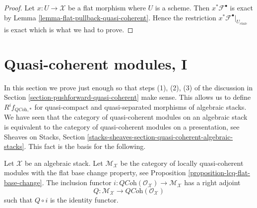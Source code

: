 \begin{proof}
Let $x : U \to \mathcal{X}$ be a flat morphism where $U$ is a scheme.
Then $x^*\mathcal{F}^\bullet$ is exact by
Lemma \ref{lemma-flat-pullback-quasi-coherent}.
Hence the restriction $x^*\mathcal{F}^\bullet|_{U_{\acute{e}tale}}$
is exact which is what we had to prove.
\end{proof}





\section{Quasi-coherent modules, I}
\label{section-quasi-coherent}

\noindent
In this section we prove just enough so that steps (1), (2), (3)
of the discussion in
Section \ref{section-pushforward-quasi-coherent}
make sense. This allows us to define $R^if_{\textit{QCoh}, *}$
for quasi-compact and quasi-separated morphisms of algebraic stacks.
We have seen that the category of quasi-coherent modules on an algebraic stack
is equivalent to the category of quasi-coherent modules on a presentation, see
Sheaves on Stacks, Section
\ref{stacks-sheaves-section-quasi-coherent-algebraic-stacks}.
This fact is the basis for the following.

\begin{lemma}
\label{lemma-adjoint}
Let $\mathcal{X}$ be an algebraic stack. Let $\mathcal{M}_\mathcal{X}$
be the category of locally quasi-coherent modules with the
flat base change property, see
Proposition \ref{proposition-lcq-flat-base-change}.
The inclusion functor
$i : \textit{QCoh}(\mathcal{O}_\mathcal{X}) \to \mathcal{M}_\mathcal{X}$
has a right adjoint
$$
Q : \mathcal{M}_\mathcal{X} \to \textit{QCoh}(\mathcal{O}_\mathcal{X})
$$
such that $Q \circ i$ is the identity functor.
\end{lemma}

